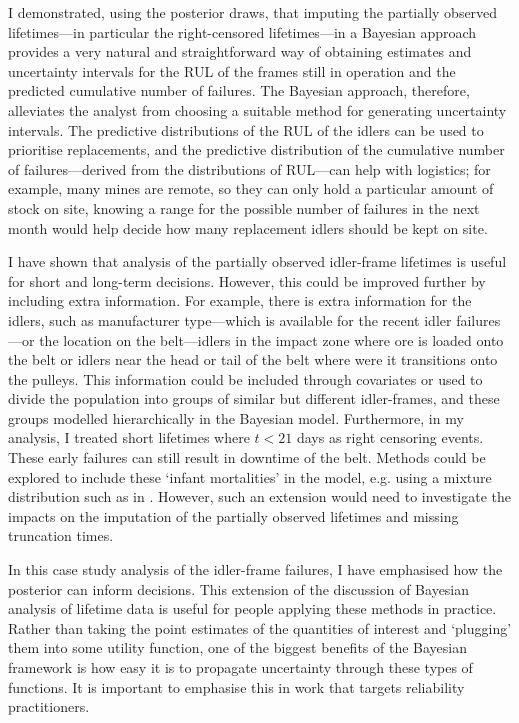 I demonstrated, using the posterior draws, that imputing the partially observed lifetimes---in particular the right-censored lifetimes---in a Bayesian approach provides a very natural and straightforward way of obtaining estimates and uncertainty intervals for the RUL of the frames still in operation and the predicted cumulative number of failures. The Bayesian approach, therefore, alleviates the analyst from choosing a suitable method for generating uncertainty intervals. The predictive distributions of the RUL of the idlers can be used to prioritise replacements, and the predictive distribution of the cumulative number of failures---derived from the distributions of RUL---can help with logistics; for example, many mines are remote, so they can only hold a particular amount of stock on site, knowing a range for the possible number of failures in the next month would help decide how many replacement idlers should be kept on site.

I have shown that analysis of the partially observed idler-frame lifetimes is useful for short and long-term decisions. However, this could be improved further by including extra information. For example, there is extra information for the idlers, such as manufacturer type---which is available for the recent idler failures---or the location on the belt---idlers in the impact zone where ore is loaded onto the belt or idlers near the head or tail of the belt where were it transitions onto the pulleys. This information could be included through covariates or used to divide the population into groups of similar but different idler-frames, and these groups modelled hierarchically in the Bayesian model. Furthermore, in my analysis, I treated short lifetimes where $t < 21$ days as right censoring events. These early failures can still result in downtime of the belt. Methods could be explored to include these `infant mortalities' in the model, e.g. using a mixture distribution such as in \citep{mittman2013}. However, such an extension would need to investigate the impacts on the imputation of the partially observed lifetimes and missing truncation times.

In this case study analysis of the idler-frame failures, I have emphasised how the posterior can inform decisions. This extension of the discussion of Bayesian analysis of lifetime data is useful for people applying these methods in practice. Rather than taking the point estimates of the quantities of interest and `plugging' them into some utility function, one of the biggest benefits of the Bayesian framework is how easy it is to propagate uncertainty through these types of functions. It is important to emphasise this in work that targets reliability practitioners.